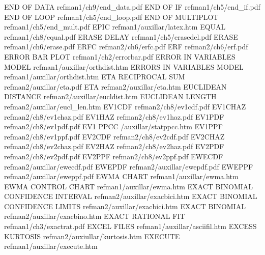 END OF DATA                             refman1/ch9/end_data.pdf
END OF IF                               refman1/ch5/end_if.pdf
END OF LOOP                             refman1/ch5/end_loop.pdf
END OF MULTIPLOT                        refman1/ch5/end_mult.pdf
EPIC                                    refman1/auxillar/latex.htm
EQUAL                                   refman1/ch8/equal.pdf
ERASE DELAY                             refman1/ch5/erasedel.pdf
ERASE                                   refman1/ch6/erase.pdf
ERFC                                    refman2/ch6/erfc.pdf
ERF                                     refman2/ch6/erf.pdf
ERROR BAR PLOT                          refman1/ch2/errorbar.pdf
ERROR IN VARIABLES MODEL                refman1/auxillar/orthdist.htm
ERRORS IN VARIABLES MODEL               refman1/auxillar/orthdist.htm
ETA RECIPROCAL SUM                      refman2/auxillar/eta.pdf
ETA                                     refman2/auxillar/eta.htm
EUCLIDEAN DISTANCE                      refman2/auxillar/eucldist.htm
EUCLIDEAN LENGTH                        refman2/auxillar/eucl_len.htm
EV1CDF                                  refman2/ch8/ev1cdf.pdf
EV1CHAZ                                 refman2/ch8/ev1chaz.pdf
EV1HAZ                                  refman2/ch8/ev1haz.pdf
EV1PDF                                  refman2/ch8/ev1pdf.pdf
EV1 PPCC                                /auxillar/statppcc.htm
EV1PPF                                  refman2/ch8/ev1ppf.pdf
EV2CDF                                  refman2/ch8/ev2cdf.pdf
EV2CHAZ                                 refman2/ch8/ev2chaz.pdf
EV2HAZ                                  refman2/ch8/ev2haz.pdf
EV2PDF                                  refman2/ch8/ev2pdf.pdf
EV2PPF                                  refman2/ch8/ev2ppf.pdf
EWECDF                                  refman2/auxillar/ewecdf.pdf
EWEPDF                                  refman2/auxillar/ewepdf.pdf
EWEPPF                                  refman2/auxillar/eweppf.pdf
EWMA CHART                              refman1/auxillar/ewma.htm
EWMA CONTROL CHART                      refman1/auxillar/ewma.htm
EXACT BINOMIAL CONFIDENCE INTERVAL      refman2/auxillar/exacbici.htm
EXACT BINOMIAL CONFIDENCE LIMITS        refman2/auxillar/exacbici.htm
EXACT BINOMIAL                          refman2/auxillar/exacbino.htm
EXACT RATIONAL FIT                      refman1/ch3/exactrat.pdf
EXCEL FILES                             refman1/auxillar/asciifil.htm
EXCESS KURTOSIS                         refman2/auxiullar/kurtosis.htm
EXECUTE                                 refman1/auxillar/execute.htm
